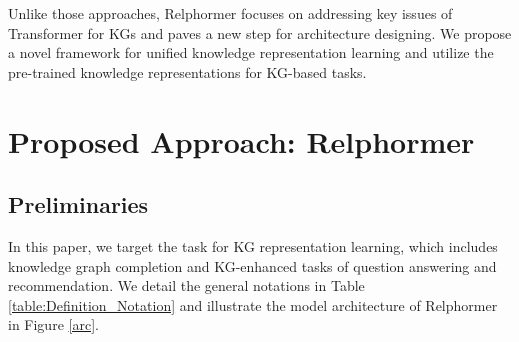 \documentclass[sigconf]{acmart}
\begin{document}
Unlike those approaches, Relphormer focuses on addressing key issues of Transformer for KGs and paves a new step for architecture designing. 
We propose a novel framework for unified knowledge representation learning and utilize the pre-trained knowledge representations for KG-based tasks.


 

\section{Proposed Approach: Relphormer}
\subsection{Preliminaries}
In this paper, we target the task for KG representation learning, which includes knowledge graph completion and KG-enhanced tasks of question answering and recommendation.
We detail the general notations in Table \ref{table:Definition_Notation} and illustrate the  model architecture of Relphormer in Figure \ref{arc}.
\end{document}
